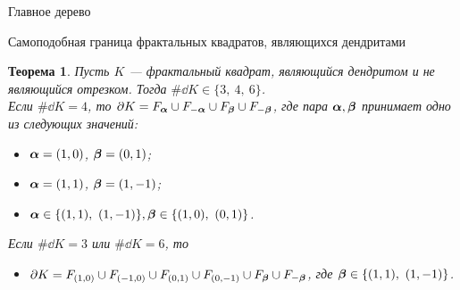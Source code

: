 \documentclass[aspectratio=1610, 10pt, notheorems]{beamer}
\newtheorem{theorem}     {Теорема}
\newtheorem{definition}  {Определение}
\begin{document}
\begin{frame}{Главное дерево}
\end{frame}


\begin{frame}{Самоподобная граница  фрактальных квадратов, являющихся дендритами}
\begin{theorem}\label{ssboundary}
Пусть $K$ --- фрактальный квадрат, являющийся дендритом и не являющийся отрезком.
Тогда $\#\dd K\in\{3,\ 4,\ 6\}$. \\
Если $\#\dd K=4$, то  $\partial K=F_{\bm{\alpha}}\cup F_{-{\bm{\alpha}}}\cup F_{\bm{\beta}}\cup F_{-{\bm{\beta}}}$, где   пара  ${\bm{\alpha}},{\bm{\beta}}$ принимает одно из следующих значений:
	\begin{itemize}%
	\item[{\bf A.}] ${\bm{\alpha}}=(1,0)$, $ {\bm{\beta}}=(0,1)$;
	\item[{\bf B.}] ${\bm{\alpha}}=(1,1)$, $ {\bm{\beta}}=(1,-1)$;
	\item[{\bf C.}] $\bma\in\{(1,1),\ (1,-1)\},\bmb\in\{(1,0),\ (0,1)\}$.
	\end{itemize}
 Если $\#\dd K=3$ или $\#\dd K=6$, то
\begin{itemize}%
	\item[{\bf D.}] $\partial K=F_{(1,0)}\cup F_{(-1,0)}\cup F_{(0,1)}\cup F_{(0,-1)}\cup F_{\bm{\beta}}\cup F_{-{\bm{\beta}}}$, где ${\bm{\beta}}\in\{(1,1),\ (1,-1)\}$.
	\end{itemize}
\end{theorem}
\end{frame}


\begin{frame}{
}
\begin{center}
\end{center}
\end{frame}
\end{document}
